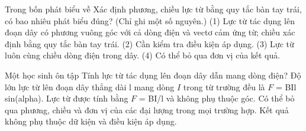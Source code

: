 \begin{ex}
Trong bốn phát biểu về Xác định phương, chiều lực từ bằng quy tắc bàn tay trái, có bao nhiêu phát biểu đúng? (Chỉ ghi một số nguyên.) (1) Lực từ tác dụng lên đoạn dây có phương vuông góc với cả dòng điện và vectơ cảm ứng từ; chiều xác định bằng quy tắc bàn tay trái. (2) Cần kiểm tra điều kiện áp dụng. (3) Lực từ luôn cùng chiều dòng điện trong dây. (4) Có thể bỏ qua đơn vị của kết quả.
\end{ex}

\begin{ex}
Một học sinh ôn tập Tính lực từ tác dụng lên đoạn dây dẫn mang dòng điện?
\choice
{\True Độ lớn lực từ lên đoạn dây thẳng dài l mang dòng $I$ trong từ trường đều là $F$ = BIl sin(alpha).}
{Lực từ được tính bằng $F$ = BI/l và không phụ thuộc góc.}
{Có thể bỏ qua phương, chiều và đơn vị của các đại lượng trong mọi trường hợp.}
{Kết quả không phụ thuộc dữ kiện và điều kiện áp dụng.}
\end{ex}

